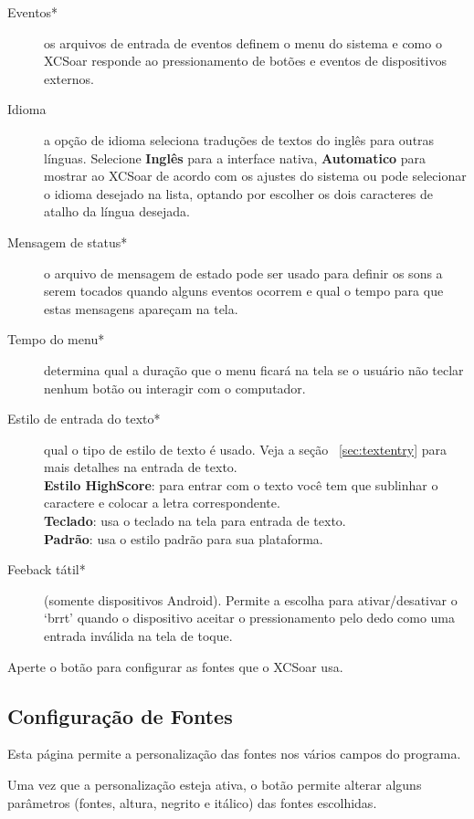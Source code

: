 \begin{description}
\item[Eventos*]  os arquivos de entrada de eventos definem o menu do sistema e como o XCSoar responde ao pressionamento de botões e eventos de dispositivos externos.
\item[Idioma]  a opção de idioma seleciona traduções de textos do inglês para outras línguas.  Selecione  {\bf Inglês} para a interface nativa, {\bf Automatico}
  para mostrar ao XCSoar de acordo com os ajustes do sistema ou pode selecionar o idioma desejado na lista, optando por escolher os dois caracteres de atalho da língua desejada.
\item[Mensagem de status*]  o arquivo de mensagem de estado pode ser usado para definir os sons a serem tocados quando alguns eventos ocorrem e qual o tempo para que estas mensagens apareçam na tela.
\item[Tempo do menu*]  determina qual a duração que o menu ficará na tela se o usuário não teclar nenhum botão ou interagir com o computador.
\item[Estilo de entrada do texto*]  qual o tipo de estilo de texto é usado.  Veja a seção ~\ref{sec:textentry} para mais detalhes na entrada de texto. \\
  {\bf Estilo HighScore}: para entrar com o texto você tem que sublinhar o caractere e colocar a letra correspondente. \\
  {\bf Teclado}: usa o teclado na tela para entrada de texto. \\
  {\bf Padrão}: usa o estilo padrão para sua plataforma.
\item[Feeback tátil*]  (somente dispositivos Android).  Permite a escolha para ativar/desativar o ‘brrt’ quando o dispositivo aceitar o pressionamento pelo dedo como uma entrada inválida na tela de toque.
\end{description}

Aperte o botão   para configurar as fontes que o XCSoar usa.

\subsection*{Configuração de Fontes}

Esta página permite a personalização das fontes nos vários campos do programa.


Uma vez que a personalização esteja ativa, o botão   permite alterar alguns parâmetros (fontes, altura, negrito e itálico) das fontes escolhidas.

